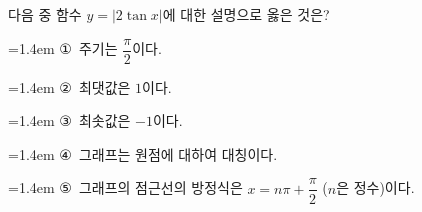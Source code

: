 다음 중 함수 $y=|2\tan x|$에 대한 설명으로 옳은 것은?
\par\medskip\par\noindent\hangindent=1.4em {\small ①}\ 주기는 $\dfrac{\pi}{2}$이다.\par\noindent\hangindent=1.4em {\small ②}\ 최댓값은 $1$이다.\par\noindent\hangindent=1.4em {\small ③}\ 최솟값은 $-1$이다.\par\noindent\hangindent=1.4em {\small ④}\ 그래프는 원점에 대하여 대칭이다.\par\noindent\hangindent=1.4em {\small ⑤}\ 그래프의 점근선의 방정식은 $x=n\pi+\dfrac{\pi}{2}$ ($n$은 정수)이다.\par\medskip
